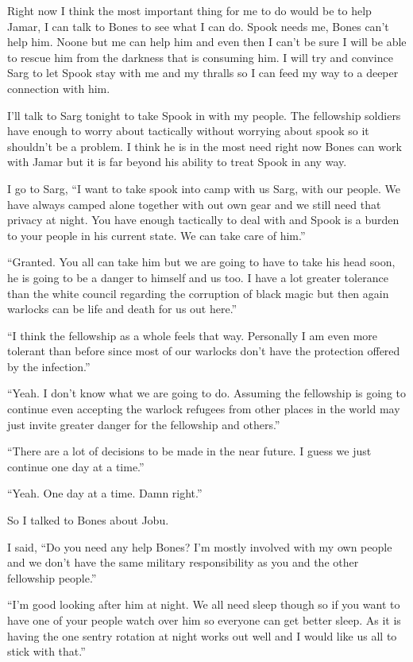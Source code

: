 Right now I think the most important thing for me to do would be to help Jamar, I can talk to Bones to see what I can do. Spook needs me, Bones can't help him. Noone but me can help him and even then I can't be sure I will be able to rescue him from the darkness that is consuming him. I will try and convince Sarg to let Spook stay with me and my thralls so I can feed my way to a deeper connection with him.

I'll talk to Sarg tonight to take Spook in with my people. The fellowship soldiers have enough to worry about tactically without worrying about spook so it shouldn't be a problem. I think he is in the most need right now Bones can work with Jamar but it is far beyond his ability to treat Spook in any way.

I go to Sarg, ``I want to take spook into camp with us Sarg, with our people. We have always camped alone together with out own gear and we still need that privacy at night. You have enough tactically to deal with and Spook is a burden to your people in his current state. We can take care of him.''

``Granted. You all can take him but we are going to have to take his head soon, he is going to be a danger to himself and us too. I have a lot greater tolerance than the white council regarding the corruption of black magic but then again warlocks can be life and death for us out here.''

``I think the fellowship as a whole feels that way. Personally I am even more tolerant than before since most of our warlocks don't have the protection offered by the infection.''

``Yeah. I don't know what we are going to do. Assuming the fellowship is going to continue even accepting the warlock refugees from other places in the world may just invite greater danger for the fellowship and others.''

``There are a lot of decisions to be made in the near future. I guess we just continue one day at a time.''

``Yeah. One day at a time. Damn right.''

So I talked to Bones about Jobu.

I said, ``Do you need any help Bones? I'm mostly involved with my own people and we don't have the same military responsibility as you and the other fellowship people.''

``I'm good looking after him at night. We all need sleep though so if you want to have one of your people watch over him so everyone can get better sleep. As it is having the one sentry rotation at night works out well and I would like us all to stick with that.''

